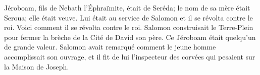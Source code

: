 Jéroboam, fils de Nebath l’Éphraïmite, était de Seréda;
	le nom de sa mère était Seroua; elle était veuve.
Lui était au service de Salomon et il se révolta contre le roi.
	Voici comment il se révolta contre le roi.
Salomon construisait le Terre-Plein pour fermer la brèche de la Cité de David son père.
Ce Jéroboam était quelqu’un de grande valeur.
Salomon avait remarqué comment le jeune homme accomplissait son ouvrage,
	et il fit de lui l’inspecteur des corvées qui pesaient sur la Maison de Joseph.

